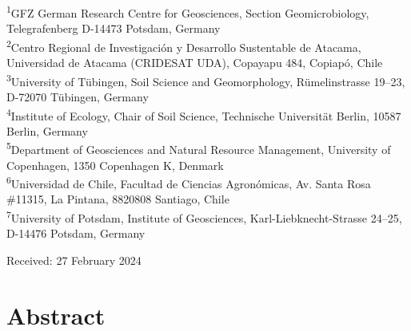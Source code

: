   \begin{scriptsize}
    \begin{justify}
        
      \textsuperscript{1}GFZ German Research Centre for Geosciences, Section Geomicrobiology, Telegrafenberg D-14473 Potsdam, Germany\\
      \textsuperscript{2}Centro Regional de Investigaci{\'o}n y Desarrollo Sustentable de Atacama, Universidad de Atacama (CRIDESAT UDA), Copayapu 484, Copiap{\'o}, Chile\\
      \textsuperscript{3}University of T{\"u}bingen, Soil Science and Geomorphology, R{\"u}melinstrasse 19--23, D-72070 T{\"u}bingen, Germany\\
      \textsuperscript{4}Institute of Ecology, Chair of Soil Science, Technische Universit{\"a}t Berlin, 10587 Berlin, Germany\\
      \textsuperscript{5}Department of Geosciences and Natural Resource Management, University of Copenhagen, 1350 Copenhagen K, Denmark\\
      \textsuperscript{6}Universidad de Chile, Facultad de Ciencias Agron{\'o}micas, Av. Santa Rosa \#11315, La Pintana, 8820808 Santiago, Chile\\
      \textsuperscript{7}University of Potsdam, Institute of Geosciences, Karl-Liebknecht-Strasse 24--25, D-14476 Potsdam, Germany

    \end{justify}
  \end{scriptsize}
    
  \vspace{0.4cm}

  \begin{flushleft}
    Received: 27 February 2024
  \end{flushleft}
  \cleardoublepage

\section*{Abstract}


